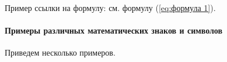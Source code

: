 Пример ссылки на формулу: см. формулу (\ref{eq:формула 1}).

\newpage
%
%	

\paragraph{Примеры различных математических знаков и символов}

Приведем несколько примеров.

